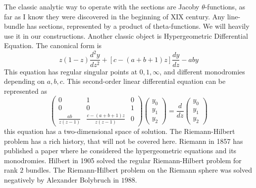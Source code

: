 \documentclass[11pt]{article}
\begin{document}
    The classic analytic way to operate with the sections are
    Jacoby $\theta$-functions, as far as I know they
    were discovered in the beginning of XIX century.
    Any line-bundle has sections, represented by a product of theta-functions.
    We will heavily use it in our constructions.
    Another classic object is Hypergeometric Differential Equation.
    The canonical form is
    \[ z(1-z) \frac{d^2y}{dz^2} + [c-(a+b+1)z] \frac{dy}{dz} - aby\]
    This equation has regular singular points at $0,1, \infty$, and different
    monodromies depending on $a,b,c$.
    This second-order linear differential equation can be represented as
    \begin{equation}
        \begin{pmatrix}
            0 & 1 & 0 \\
            0 & 0 & 1 \\
            \frac{ab}{z(z-1)} & \frac{c - (a+b+1)z}{z(z-1)} & 0

        \end{pmatrix}  \begin{pmatrix} y_0 \\ y_1 \\ y_2
                           \end{pmatrix} = \frac{d}{dz} \begin{pmatrix} y_0 \\ y_1 \\ y_2
                                               \end{pmatrix}
    \end{equation}
        this equation has a two-dimensional space of solution.
        The Riemann-Hilbert problem has a rich history, that will not be covered here.
        Riemann in 1857 has published a paper where he considered the hypergeometric
    equations and its monodromies.
        Hilbert in 1905 solved the regular Riemann-Hilbert problem
        for rank $2$ bundles.
    The Riemann-Hilbert problem on the Riemann
        sphere was solved negatively by Alexander Bolybruch in $1988$.
\end{document}
